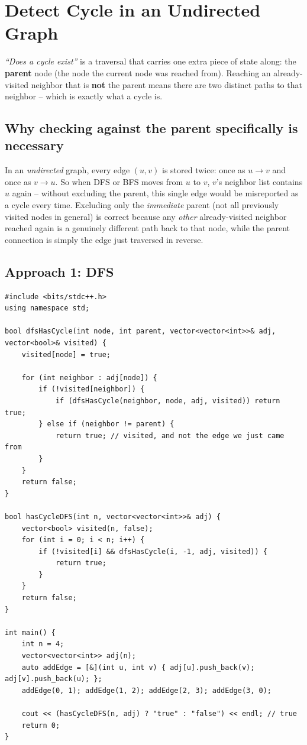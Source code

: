 \section{Detect Cycle in an Undirected Graph}
\label{sec:graph-cycle-undirected}


\begin{patternbox}
\emph{``Does a cycle exist''} is a traversal that carries one extra
piece of state along: the \textbf{parent} node (the node the current
node was reached from). Reaching an already-visited neighbor that is
\textbf{not} the parent means there are two distinct paths to that
neighbor -- which is exactly what a cycle is.
\end{patternbox}

\subsection*{Why checking against the parent specifically is necessary}

In an \emph{undirected} graph, every edge $(u,v)$ is stored twice: once
as $u \to v$ and once as $v \to u$. So when DFS or BFS moves from $u$
to $v$, $v$'s neighbor list contains $u$ again -- without excluding the
parent, this single edge would be misreported as a cycle every time.
Excluding only the \emph{immediate} parent (not all previously visited
nodes in general) is correct because any \emph{other} already-visited
neighbor reached again is a genuinely different path back to that
node, while the parent connection is simply the edge just traversed in
reverse.

\subsection*{Approach 1: DFS}

\begin{lstlisting}
#include <bits/stdc++.h>
using namespace std;

bool dfsHasCycle(int node, int parent, vector<vector<int>>& adj, vector<bool>& visited) {
    visited[node] = true;

    for (int neighbor : adj[node]) {
        if (!visited[neighbor]) {
            if (dfsHasCycle(neighbor, node, adj, visited)) return true;
        } else if (neighbor != parent) {
            return true; // visited, and not the edge we just came from
        }
    }
    return false;
}

bool hasCycleDFS(int n, vector<vector<int>>& adj) {
    vector<bool> visited(n, false);
    for (int i = 0; i < n; i++) {
        if (!visited[i] && dfsHasCycle(i, -1, adj, visited)) {
            return true;
        }
    }
    return false;
}

int main() {
    int n = 4;
    vector<vector<int>> adj(n);
    auto addEdge = [&](int u, int v) { adj[u].push_back(v); adj[v].push_back(u); };
    addEdge(0, 1); addEdge(1, 2); addEdge(2, 3); addEdge(3, 0);

    cout << (hasCycleDFS(n, adj) ? "true" : "false") << endl; // true
    return 0;
}
\end{lstlisting}

